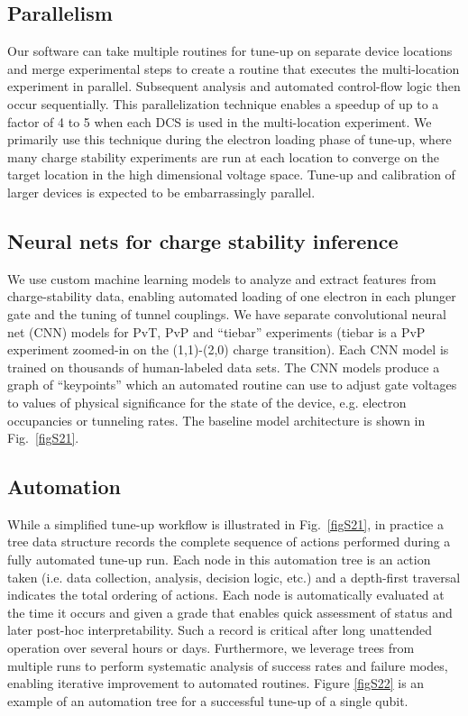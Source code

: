 \documentclass[aps,prl,twocolumn,superscriptaddress,nobibnotes,10pt,floatfix]{revtex4-2}
\newcommand{\figref}[1]{Fig.~\ref{#1}}
\begin{document}
\subsection{Parallelism}\label{parallelism}

Our software can take multiple routines for tune-up on separate device locations and merge experimental steps to create a routine that executes the multi-location experiment in parallel.
Subsequent analysis and automated control-flow logic then occur sequentially.
This parallelization technique enables a speedup of up to a factor of 4 to 5 when each DCS is used in the multi-location experiment.
We primarily use this technique during the electron loading phase of tune-up, where many charge stability experiments are run at each location to converge on the target location in the high dimensional voltage space.
Tune-up and calibration of larger devices is expected to be embarrassingly parallel.

\subsection{Neural nets for charge stability inference}\label{neural-nets-for-charge-stability-inference}

We use custom machine learning models to analyze and extract features from charge-stability data, enabling automated loading of one electron in each plunger gate and the tuning of tunnel couplings.
We have separate convolutional neural net (CNN) models for PvT, PvP and ``tiebar'' experiments (tiebar is a PvP experiment zoomed-in on the (1,1)-(2,0) charge transition).
Each CNN model is trained on thousands of human-labeled data sets.
The CNN models produce a graph of ``keypoints'' which an automated routine can use to adjust gate voltages to values of physical significance for the state of the device, e.g. electron occupancies or tunneling rates.
The baseline model architecture is shown in \figref{figS21}.


\subsection{Automation}\label{automation}

While a simplified tune-up workflow is illustrated in \figref{figS21}, in practice a tree data structure records the complete sequence of actions performed during a fully automated tune-up run.
Each node in this automation tree is an action taken (i.e.  data collection, analysis, decision logic, etc.) and a depth-first traversal indicates the total ordering of actions.
Each node is automatically evaluated at the time it occurs and given a grade that enables quick assessment of status and later post-hoc interpretability.
Such a record is critical after long unattended operation over several hours or days.
Furthermore, we leverage trees from multiple runs to perform systematic analysis of success rates and failure modes, enabling iterative improvement to automated routines.
Figure \ref{figS22} is an example of an automation tree for a successful tune-up of a single qubit.
\end{document}
